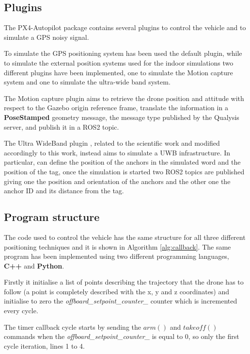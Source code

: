 \documentclass[journal]{IEEEtran}
\begin{document}
\subsection{Plugins} \label{sec:plugin}

The PX4-Autopilot package contains several plugins to control the vehicle and to simulate a GPS noisy signal. 

To simulate the GPS positioning system has been used the default plugin, while to simulate the external position systems used for the indoor simulations two different plugins have been implemented, one to simulate the Motion capture system and one to simulate the ultra-wide band system.

The Motion capture plugin \cite{mocap_plugin} aims to retrieve the drone position and attitude with respect to the Gazebo origin reference frame, translate the information in a \textbf{PoseStamped} geometry message, the message type published by the Qualysis server, and publish it in a ROS2 topic.

The Ultra WideBand plugin \cite{uwb_plugin}, related to the scientific work \cite{uwb_plugin_paper} and modified accordingly to this work, instead aims to simulate a UWB infrastructure. In particular, can define the position of the anchors in the simulated word and the position of the tag, once the simulation is started two ROS2 topics are published giving one the position and orientation of the anchors and the other one the anchor ID and its distance from the tag.

\subsection{Program structure}

The code used to control the vehicle has the same structure for all three different positioning techniques and it is shown in Algorithm \ref{alg:callback}. The same program has been implemented using two different programming languages, \textbf{C++} and \textbf{Python}.

Firstly it initialise a list of points describing the trajectory that the drone has to follow (a point is completely described with the x, y and z coordinates) and initialise to zero the \textit{offboard\_setpoint\_counter\_} counter which is incremented every cycle.

The timer callback cycle starts by sending the $arm()$ and $takeoff()$ commands when the \textit{offboard\_setpoint\_counter\_} is equal to 0, so only the first cycle iteration, lines 1 to 4.
\end{document}

